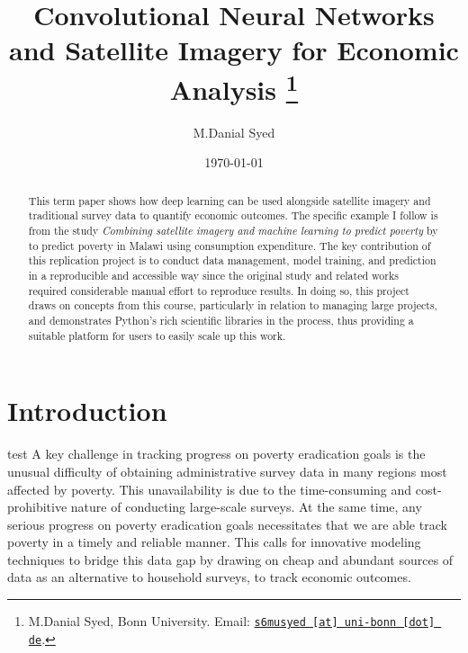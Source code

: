 \documentclass[11pt, a4paper, leqno]{article}
\begin{document}
\title{Convolutional Neural Networks and Satellite Imagery for Economic Analysis \thanks{M.Danial Syed, Bonn University. Email: \href{mailto:s6musyed@uni-bonn.de}{\nolinkurl{s6musyed [at] uni-bonn [dot] de}}.}}

\author{M.Danial Syed}

\date{
    \today
}

\maketitle


\begin{abstract}
\noindent This term paper shows how deep learning can be used alongside satellite imagery and traditional survey data to quantify economic outcomes. The specific example I follow is from the study \textit{Combining satellite imagery and machine learning to predict poverty} by \citet{jean2016combining} to predict poverty in Malawi using consumption expenditure. The key contribution of this replication project is to conduct data management, model training, and prediction in a reproducible and accessible way since the original study and related works required considerable manual effort to reproduce results. In doing so, this project draws on concepts from this course, particularly in relation to managing large projects, and demonstrates Python's rich scientific libraries in the process, thus providing a suitable platform for users to easily scale up this work.
\end{abstract}

\clearpage


\section{Introduction} %
\label{sec:introduction}
test
A key challenge in tracking progress on poverty eradication goals is the unusual difficulty of obtaining administrative survey data in many regions most affected by poverty. This unavailability is due to the time-consuming and cost-prohibitive nature of conducting large-scale surveys. At the same time, any serious progress on poverty eradication goals necessitates that we are able track poverty in a timely and reliable manner. This calls for innovative modeling techniques to bridge this data gap by drawing on cheap and abundant sources of data as an alternative to household surveys, to track economic outcomes.
\end{document}
